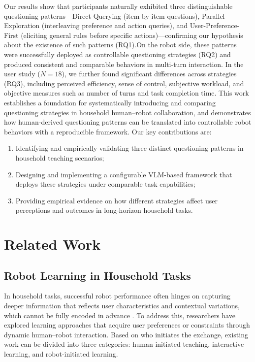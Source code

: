 \documentclass[sigconf,authordraft]{acmart}
\begin{document}
Our results show that participants naturally exhibited three distinguishable questioning patterns—Direct Querying (item-by-item questions), Parallel Exploration (interleaving preference and action queries), and User-Preference-First (eliciting general rules before specific actions)—confirming our hypothesis about the existence of such patterns (RQ1).On the robot side, these patterns were successfully deployed as controllable questioning strategies (RQ2) and produced consistent and comparable behaviors in multi-turn interaction. In the user study ($N=18$), we further found significant differences across strategies (RQ3), including perceived efficiency, sense of control, subjective workload, and objective measures such as number of turns and task completion time. This work establishes a foundation for systematically introducing and comparing questioning strategies in household human--robot collaboration, and demonstrates how human-derived questioning patterns can be translated into controllable robot behaviors with a reproducible framework. Our key contributions are:
\begin{enumerate}
  \item Identifying and empirically validating three distinct questioning patterns in household teaching scenarios;
  \item Designing and implementing a configurable VLM-based framework that deploys these strategies under comparable task capabilities;
  \item Providing empirical evidence on how different strategies affect user perceptions and outcomes in long-horizon household tasks.
\end{enumerate}


\section{Related Work}
\subsection{Robot Learning in Household Tasks}

In household tasks, successful robot performance often hinges on capturing deeper information that reflects user characteristics and contextual variations, which cannot be fully encoded in advance \cite{zhong2021gap}. To address this, researchers have explored learning approaches that acquire user preferences or constraints through dynamic human–robot interaction. Based on who initiates the exchange, existing work can be divided into three categories: human-initiated teaching, interactive learning, and robot-initiated learning.
\end{document}
